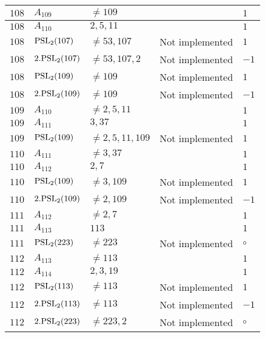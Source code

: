 \documentclass[a4paper, 11pt]{article}
\begin{document}
\begin{longtable}{lllll}
        $ 108 $ & $ A_{109} $ & $ \neq 109 $ & $ ~ $ & $ 1  $ \\ \hline
        $ 108 $ & $ A_{110} $ & $ 2, 5, 11 $ & $ ~ $ & $ 1  $ \\ \hline
        $ 108 $ & $ {\rm PSL}_{2}(107) $ & $ \neq 53, 107 $ & Not implemented & $ 1  $ \\ \hline
        $ 108 $ & $ 2.{\rm PSL}_{2}(107) $ & $ \neq 53, 107, 2 $ & Not implemented & $ -1  $ \\ \hline
        $ 108 $ & $ {\rm PSL}_{2}(109) $ & $ \neq 109 $ & Not implemented & $ 1  $ \\ \hline
        $ 108 $ & $ 2.{\rm PSL}_{2}(109) $ & $ \neq 109 $ & Not implemented & $ -1  $ \\ \hline
        $ 109 $ & $ A_{110} $ & $ \neq 2, 5, 11 $ & $ ~ $ & $ 1  $ \\ \hline
        $ 109 $ & $ A_{111} $ & $ 3, 37 $ & $ ~ $ & $ 1  $ \\ \hline
        $ 109 $ & $ {\rm PSL}_{2}(109) $ & $ \neq 2, 5, 11, 109 $ & Not implemented & $ 1  $ \\ \hline
        $ 110 $ & $ A_{111} $ & $ \neq 3, 37 $ & $ ~ $ & $ 1  $ \\ \hline
        $ 110 $ & $ A_{112} $ & $ 2, 7 $ & $ ~ $ & $ 1  $ \\ \hline
        $ 110 $ & $ {\rm PSL}_{2}(109) $ & $ \neq 3, 109 $ & Not implemented & $ 1  $ \\ \hline
        $ 110 $ & $ 2.{\rm PSL}_{2}(109) $ & $ \neq 2, 109 $ & Not implemented & $ -1  $ \\ \hline
        $ 111 $ & $ A_{112} $ & $ \neq 2, 7 $ & $ ~ $ & $ 1  $ \\ \hline
        $ 111 $ & $ A_{113} $ & $ 113 $ & $ ~ $ & $ 1  $ \\ \hline
        $ 111 $ & $ {\rm PSL}_{2}(223) $ & $ \neq 223 $ & Not implemented & $\circ$ \\ \hline
        $ 112 $ & $ A_{113} $ & $ \neq 113 $ & $ ~ $ & $ 1  $ \\ \hline
        $ 112 $ & $ A_{114} $ & $ 2, 3, 19 $ & $ ~ $ & $ 1  $ \\ \hline
        $ 112 $ & $ {\rm PSL}_{2}(113) $ & $ \neq 113 $ & Not implemented & $ 1  $ \\ \hline
        $ 112 $ & $ 2.{\rm PSL}_{2}(113) $ & $ \neq 113 $ & Not implemented & $ -1  $ \\ \hline
        $ 112 $ & $ 2.{\rm PSL}_{2}(223) $ & $ \neq 223, 2 $ & Not implemented & $\circ$ \\ \hline

\end{longtable}
\end{document}
